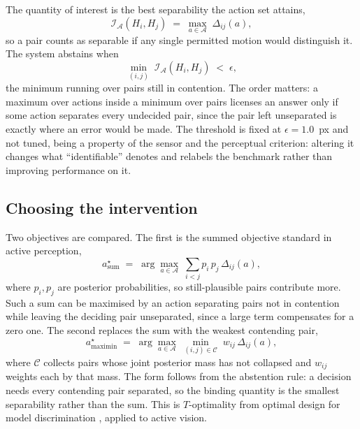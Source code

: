 The quantity of interest is the best separability the action set attains,
\begin{equation}
\label{eq:identifiability}
\mathcal{I}_{\mathcal{A}}\!\left(H_i, H_j\right)
\;=\; \max_{a \in \mathcal{A}} \; \Delta_{ij}(a),
\end{equation}
so a pair counts as separable if any single permitted motion would distinguish it.
The system abstains when
\begin{equation}
\label{eq:abstain}
\min_{(i,j)} \; \mathcal{I}_{\mathcal{A}}\!\left(H_i, H_j\right) \;<\; \epsilon ,
\end{equation}
the minimum running over pairs still in contention. The order matters: a maximum
over actions inside a minimum over pairs licenses an answer only if some action
separates every undecided pair, since the pair left unseparated is exactly where an
error would be made. The threshold is fixed at $\epsilon = 1.0$~px and not tuned,
being a property of the sensor and the perceptual criterion: altering it changes
what ``identifiable'' denotes and relabels the benchmark rather than improving
performance on it.

\subsection{Choosing the intervention}
\label{sec:selection}

Two objectives are compared. The first is the summed objective standard in active
perception,
\begin{equation}
\label{eq:sum}
a^{\star}_{\text{sum}} \;=\; \arg\max_{a \in \mathcal{A}}
\;\sum_{i<j} p_i\, p_j\, \Delta_{ij}(a),
\end{equation}
where $p_i, p_j$ are posterior probabilities, so still-plausible pairs contribute
more. Such a sum can be maximised by an action separating pairs not in contention
while leaving the deciding pair unseparated, since a large term compensates for a
zero one. The second replaces the sum with the weakest contending pair,
\begin{equation}
\label{eq:maximin}
a^{\star}_{\text{maximin}} \;=\; \arg\max_{a \in \mathcal{A}}
\;\min_{(i,j) \in \mathcal{C}} \; w_{ij}\, \Delta_{ij}(a),
\end{equation}
where $\mathcal{C}$ collects pairs whose joint posterior mass has not collapsed and
$w_{ij}$ weights each by that mass. The form follows from the abstention rule: a
decision needs every contending pair separated, so the binding quantity is the
smallest separability rather than the sum. This is $T$-optimality from optimal
design for model discrimination
\citep{atkinson1975design,hunter1965experimental}, applied to active vision.

